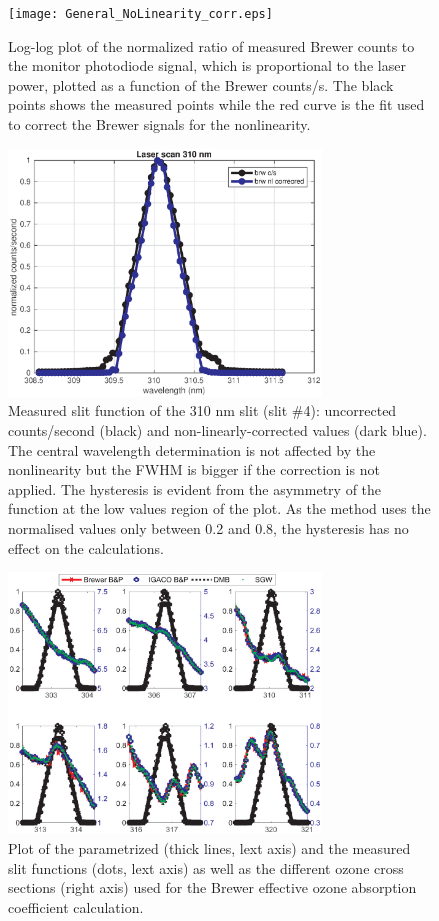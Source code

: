 \documentclass[acp, manuscript]{copernicus}
\begin{document}
\clearpage
\begin{figure}[t]
\texttt{[image: General\_NoLinearity\_corr.eps]}
\caption{ Log-log plot of the normalized ratio of measured Brewer counts to the monitor photodiode signal, which is proportional to the laser power, plotted as a function of the Brewer counts/s. The black points shows the measured points while the red curve is the fit used to correct the Brewer signals for the nonlinearity.}
\label{fig:no}
\end{figure}
\clearpage
\begin{figure}[t]
\includegraphics[width=8.3cm]{figures/General_Corrected_vs_uncorrected.eps}
\caption{Measured slit function of the 310 nm slit (slit \#4): uncorrected counts/second (black) and non-linearly-corrected values (dark blue). The central wavelength determination is not affected by the nonlinearity but the FWHM is bigger if the correction is not applied. The hysteresis is evident from the asymmetry of the function at the low values region of the plot. As the method uses the normalised values only between 0.2 and 0.8, the hysteresis has no effect on the calculations.}
\label{fig:slitcor}
\end{figure}

%

\clearpage
%
\begin{figure}[t]
\includegraphics[width=8.3cm]{figures/General_Laser_Brewer_ozone_mode.eps}
\caption{ Plot of the parametrized (thick lines, lext axis) and the measured slit functions (dots, lext axis) as well as the different ozone cross sections (right axis) used for the Brewer effective ozone absorption coefficient calculation.}
\label{fig:param}
\end{figure}
\end{document}
